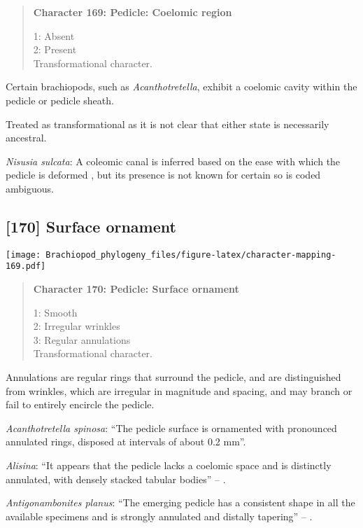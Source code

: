 \documentclass[openany]{book}
\theoremstyle{definition}
\theoremstyle{definition}
\theoremstyle{definition}
\theoremstyle{remark}
\begin{document}
\begin{quote}
\textbf{Character 169: Pedicle: Coelomic region}

1: Absent\\
2: Present\\
Transformational character.
\end{quote}

Certain brachiopods, such as \emph{Acanthotretella}, exhibit a coelomic
cavity within the pedicle or pedicle sheath.

Treated as transformational as it is not clear that either state is
necessarily ancestral.

\hypertarget{Nisusia_sulcata-coding-169}{}
\emph{Nisusia sulcata}: A coleomic canal is inferred based on the ease
with which the pedicle is deformed
\citep{Holmer2018Evolutionarysignificance}, but its presence is not
known for certain so is coded ambiguous.

\subsection*{{[}170{]} Surface ornament}\label{surface-ornament-1}

\texttt{[image: Brachiopod\_phylogeny\_files/figure-latex/character-mapping-169.pdf]}

\begin{quote}
\textbf{Character 170: Pedicle: Surface ornament}

1: Smooth\\
2: Irregular wrinkles\\
3: Regular annulations\\
Transformational character.
\end{quote}

Annulations are regular rings that surround the pedicle, and are
distinguished from wrinkles, which are irregular in magnitude and
spacing, and may branch or fail to entirely encircle the pedicle.

\hypertarget{Acanthotretella_spinosa-coding-170}{}
\emph{Acanthotretella spinosa}: ``The pedicle surface is ornamented with
pronounced annulated rings, disposed at intervals of about 0.2 mm''.

\hypertarget{Alisina-coding-170}{}
\emph{Alisina}: ``It appears that the pedicle lacks a coelomic space and
is distinctly annulated, with densely stacked tabular bodies'' --
\citet{Zhang2011Anobolellate}.

\hypertarget{Antigonambonites_planus-coding-170}{}
\emph{Antigonambonites planus}: ``The emerging pedicle has a consistent
shape in all the available specimens and is strongly annulated and
distally tapering'' -- \citet{Holmer2018Evolutionarysignificance}.
\end{document}
